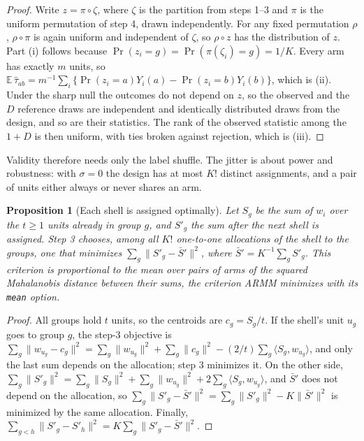 \documentclass[11pt]{article}
\newtheorem{proposition}{Proposition}
\theoremstyle{remark}
\newcommand{\E}{\mathbb{E}}
\begin{document}
\begin{proof}
Write $z = \pi \circ \zeta$, where $\zeta$ is the partition from steps 1--3
and $\pi$ is the uniform permutation of step 4, drawn independently. For any
fixed permutation $\rho$, $\rho \circ \pi$ is again uniform and independent
of $\zeta$, so $\rho \circ z$ has the distribution of $z$. Part (i) follows
because $\Pr(z_i = g) = \Pr(\pi(\zeta_i) = g) = 1/K$. Every arm has exactly
$m$ units, so $\E\,\hat\tau_{ab} = m^{-1}\sum_i \{\Pr(z_i = a) Y_i(a) -
\Pr(z_i = b) Y_i(b)\}$, which is (ii). Under the sharp null the outcomes do
not depend on $z$, so the observed and the $D$ reference draws are
independent and identically distributed draws from the design, and so are
their statistics. The rank of the observed statistic among the $1 + D$ is
then uniform, with ties broken against rejection, which is (iii).
\end{proof}

Validity therefore needs only the label shuffle. The jitter is about power
and robustness: with $\sigma = 0$ the design has at most $K!$ distinct
assignments, and a pair of units either always or never shares an arm.

\begin{proposition}[Each shell is assigned optimally]\label{prop:step}
Let $S_g$ be the sum of $w_i$ over the $t \ge 1$ units already in group $g$,
and $S'_g$ the sum after the next shell is assigned. Step 3 chooses, among
all $K!$ one-to-one allocations of the shell to the groups, one that
minimizes $\sum_g \|S'_g - \bar S'\|^2$, where $\bar S' = K^{-1}\sum_g S'_g$.
This criterion is proportional to the mean over pairs of arms of the
squared Mahalanobis distance between their sums, the criterion ARMM
minimizes with its \texttt{mean} option.
\end{proposition}

\begin{proof}
All groups hold $t$ units, so the centroids are $c_g = S_g/t$. If the shell's
unit $u_g$ goes to group $g$, the step-3 objective is $\sum_g \|w_{u_g} -
c_g\|^2 = \sum_g \|w_{u_g}\|^2 + \sum_g \|c_g\|^2 - (2/t)\sum_g \langle S_g,
w_{u_g}\rangle$, and only the last sum depends on the allocation; step 3
minimizes it. On the other side, $\sum_g \|S'_g\|^2 = \sum_g \|S_g\|^2 +
\sum_g \|w_{u_g}\|^2 + 2 \sum_g \langle S_g, w_{u_g}\rangle$, and $\bar S'$
does not depend on the allocation, so $\sum_g \|S'_g - \bar S'\|^2 = \sum_g
\|S'_g\|^2 - K\|\bar S'\|^2$ is minimized by the same allocation. Finally,
$\sum_{g<h}\|S'_g - S'_h\|^2 = K \sum_g \|S'_g - \bar S'\|^2$.
\end{proof}
\end{document}
